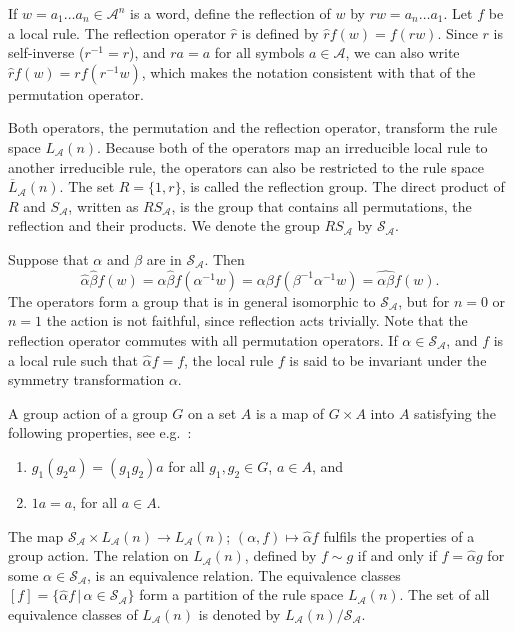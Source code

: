\documentclass[11pt,a4paper]{article}
\newcommand{\rev}[1]{{\color{blue}#1}}
\newcommand{\rev}[1]{{\color{black}#1}}
\begin{document}
If $w = a_1\ldots a_{n} \in \mathcal{A}^n$ is a word,
define the reflection of $w$ by $rw  = a_{n} \ldots a_1$.
Let $f$ be a local rule.
The reflection operator $\hat{r}$ is defined by $\hat{r} f(w) = f(rw)$.
Since $r$ is self-inverse ($r^{-1} = r$),
and $ra = a$ for all symbols $a \in \mathcal{A}$, we can also write $\hat{r} f(w) = rf(r^{-1}w)$,
which makes the notation consistent with that of the permutation operator.

Both operators, the permutation and the reflection operator, transform the rule
space $L_\mathcal{A}(n)$.
Because both of the operators map an irreducible local rule to another irreducible rule,
the operators can also be restricted to the rule space $\overline{L}_\mathcal{A}(n)$.
The set $R = \{1, r\}$, is called the reflection group.
The direct product of $R$ and $S_\mathcal{A}$, written as $RS_\mathcal{A}$, is the group that contains all permutations,
the reflection and their products.
We denote the group $RS_\mathcal{A}$ by  $\mathcal{S}_\mathcal{A}$.

Suppose that $\alpha$ and $\beta$ are in $\mathcal{S}_\mathcal{A}$.
Then
\[
\hat{\alpha} \hat{\beta} f (w)  = \alpha \hat{\beta} f(\alpha^{-1} w)
= \alpha \beta f( \beta^{-1} \alpha^{-1} w) = \widehat{\alpha \beta} f(w).
\]
The operators form a group that is in general isomorphic to $\mathcal{S}_\mathcal{A}$,
\rev{but for $n=0$ or $n=1$ the action is not faithful, since reflection acts trivially.}
Note that the reflection operator commutes with all permutation operators.
If $\alpha \in \mathcal{S}_\mathcal{A}$, and $f$ is a local rule such that $\hat{\alpha} f = f$,
the local rule $f$ is said to be invariant under the symmetry transformation $\alpha$.

A group action of a group $G$ on a set $A$ is a map of $G \times A$ into $A$
satisfying the following properties, see e.g.~\cite{rotman2012introduction}:
\begin{enumerate}[label=(\roman*)]
\item $g_1(g_2a) = (g_1g_2)a$ for all $g_1,g_2 \in G$, $a \in A$, and
\item $1a=a$, for all $a \in A$.
\end{enumerate}

The map $\mathcal{S}_\mathcal{A} \times L_\mathcal{A}(n) \to L_\mathcal{A}(n)$; \rev{$(\alpha, f) \mapsto \hat{\alpha} f$}
fulfils the properties of a group action.
The relation on $L_\mathcal{A}(n)$, defined by $f \sim g$ if and only if $f = \hat{\alpha} g$ for some
$\alpha \in \mathcal{S}_\mathcal{A}$, is an equivalence relation.
The equivalence classes $[f] = \{ \hat{\alpha}f \, | \, \alpha \in \mathcal{S}_\mathcal{A} \}$ form a partition
of the rule space $L_\mathcal{A}(n)$.
The set of all equivalence classes of $L_\mathcal{A}(n)$ is denoted by $L_\mathcal{A}(n) / \mathcal{S}_\mathcal{A}$.
\end{document}
